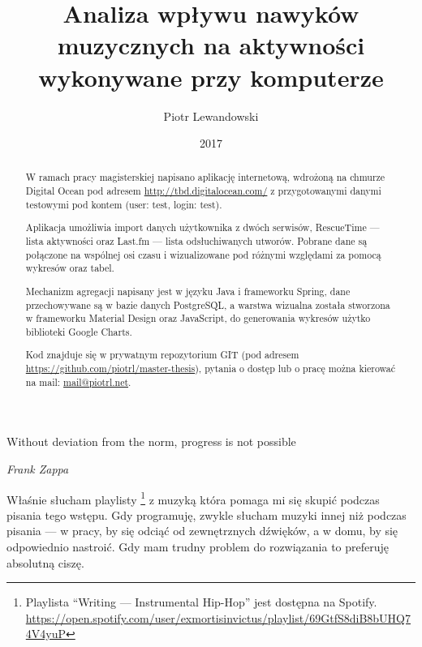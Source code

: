 \documentclass[brudnopis]{xmgr}
\author   {Piotr Lewandowski}
\title    {Analiza wpływu nawyków muzycznych na aktywności wykonywane przy komputerze}
\date     {2017}
\begin{document}
\begin{abstract}
    W ramach pracy magisterskiej napisano aplikację internetową,
    wdrożoną na chmurze Digital Ocean pod adresem \url{http://tbd.digitalocean.com/}
    z przygotowanymi danymi testowymi pod kontem (user: test, login: test).

    Aplikacja umożliwia import danych użytkownika z dwóch serwisów,
    RescueTime — lista aktywności oraz
    Last.fm — lista odsłuchiwanych utworów.
    Pobrane dane są połączone na wspólnej osi czasu i wizualizowane pod różnymi względami za pomocą wykresów oraz tabel.

    Mechanizm agregacji napisany jest w języku Java i frameworku Spring,
    dane przechowywane są w bazie danych PostgreSQL,
    a warstwa wizualna została stworzona w frameworku Material Design oraz JavaScript,
    do generowania wykresów użytko biblioteki Google Charts.

    Kod znajduje się w prywatnym repozytorium GIT (pod adresem \url{https://github.com/piotrl/master-thesis}),
    pytania o dostęp lub o pracę można kierować na mail: \url{mail@piotrl.net}.
\end{abstract}


\maketitle

\introduction

\epigraph{Without deviation from the norm, progress is not possible}{\textit{Frank Zappa}}

    Właśnie słucham playlisty
    \footnote{Playlista ``Writing --- Instrumental Hip-Hop'' jest dostępna na Spotify.
    \url{https://open.spotify.com/user/exmortisinvictus/playlist/69GtfS8diB8bUHQ74V4yuP}}
    z muzyką która pomaga mi się skupić podczas pisania tego wstępu.
    Gdy programuję, zwykle słucham muzyki innej niż podczas pisania ---
    w pracy, by się odciąć od zewnętrznych dźwięków, a w domu, by się odpowiednio nastroić.
    Gdy mam trudny problem do rozwiązania to preferuję absolutną ciszę.
\end{document}
